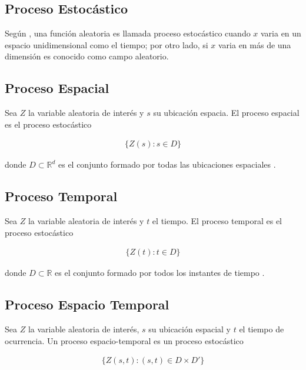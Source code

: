 \documentclass[
]{book}
\begin{document}
\hypertarget{proceso-estocuxe1stico}{%
\subsection{Proceso Estocástico}\label{proceso-estocuxe1stico}}

Según \citep{GeoJean}, una función aleatoria es llamada proceso estocástico cuando \(x\) varia en un espacio unidimensional como el tiempo; por otro lado, si \(x\) varia en más de una dimensión es conocido como campo aleatorio.

\hypertarget{proceso-espacial}{%
\subsection{Proceso Espacial}\label{proceso-espacial}}

Sea \(Z\) la variable aleatoria de interés y \(s\) su ubicación espacia. El proceso espacial es el proceso estocástico

\begin{align}
\{Z(s):s \in D\}
\end{align}

donde \(D \subset \mathbb{R}^d\) es el conjunto formado por todas las ubicaciones espaciales \citep{marta}.

\hypertarget{proceso-temporal}{%
\subsection{Proceso Temporal}\label{proceso-temporal}}

Sea \(Z\) la variable aleatoria de interés y \(t\) el tiempo. El proceso temporal es el proceso estocástico

\begin{align}
\{Z(t):t \in D\}
\end{align}

donde \(D \subset \mathbb{R}\) es el conjunto formado por todos los instantes de tiempo \citep{marta}.

\hypertarget{proceso-espacio-temporal}{%
\subsection{Proceso Espacio Temporal}\label{proceso-espacio-temporal}}

Sea \(Z\) la variable aleatoria de interés, \(s\) su ubicación espacial y \(t\) el tiempo de ocurrencia. Un proceso espacio-temporal es un proceso estocástico

\begin{align}
\{Z(s,t):(s,t) \in D \times D' \}
\end{align}
\end{document}
